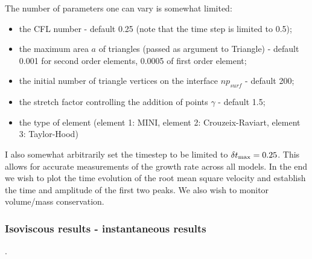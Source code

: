 The number of parameters one can vary is somewhat limited:
\begin{itemize}
\item the CFL number - default 0.25 (note that the time step is limited to 0.5);
\item the maximum area $a$ of triangles (passed as argument to Triangle) - default 0.001 for second order elements,
0.0005 of first order element;
\item the initial number of triangle vertices on the interface $np_{surf}$ - default 200;
\item the stretch factor controlling the addition of points $\gamma$ - default 1.5;
\item the type of element (element 1: MINI, element 2: Crouzeix-Raviart, element 3: Taylor-Hood)  
\end{itemize}

I also somewhat arbitrarily set the timestep to be limited to $\delta t_{\rm max}=0.25$. This allows for accurate 
measurements of the growth rate across all models. 
In the end we wish to plot the time evolution of the root mean square velocity and 
establish the time and amplitude of the first two peaks. We also wish to monitor volume/mass conservation.  

\newpage
\subsubsection*{Isoviscous results - instantaneous results}.

